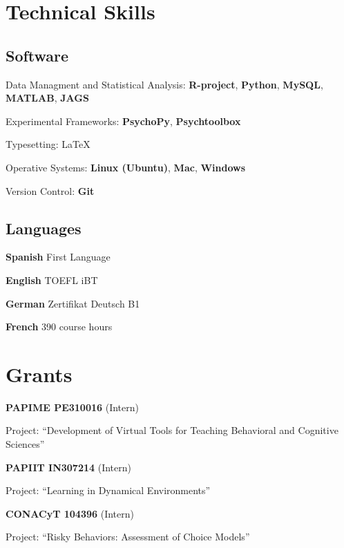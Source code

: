 \documentclass[letterpaper]{article}
\renewenvironment{itemize}{
  \begin{list}{}{
    \setlength{\leftmargin}{1.5em}
  }
}{
  \end{list}
}
\newcommand\textline[4][t]{%
  \par\smallskip\indent\parbox[#1]{.7\textwidth}{\raggedright\texttt{}#2}%
  \parbox[#1]{.05\textwidth}{\raggedright#3}%
  \parbox[#1]{.25\textwidth}{\raggedleft{#4}}\par%
}
\begin{document}
\section*{Technical Skills}

\subsection*{Software}
\begin{itemize}
\setlength\itemsep{-.25em}
\setlength{\itemindent}{-.125in}
	\item Data Managment and Statistical Analysis: {\bf R-project}, {\bf Python}, {\bf MySQL}, {\bf MATLAB}, {\bf JAGS}
	\item Experimental Frameworks: {\bf PsychoPy}, {\bf Psychtoolbox}
	\item Typesetting: \LaTeX
	\item Operative Systems: {\bf Linux (Ubuntu)}, {\bf Mac}, {\bf Windows}
	\item Version Control: {\bf Git}
\end{itemize}

\subsection*{Languages}
\begin{itemize}
\setlength\itemsep{-.25em}
\setlength{\itemindent}{-.125in}
	\item{\bf Spanish} First Language
	\item{\bf English} TOEFL iBT
	\item{\bf German} Zertifikat Deutsch B1
	\item{\bf French} 390 course hours
\end{itemize}






\section*{Grants}
\begin{itemize}
\setlength\itemsep{-.25em}
\setlength{\itemindent}{-.125in}
	\item \textline{{\bf PAPIME PE310016} (Intern)}{\hspace{1pt}}{2015} 
	\item {Project: ``Development of Virtual Tools for Teaching Behavioral and Cognitive Sciences''}
	\item \textline{{\bf PAPIIT IN307214} (Intern)}{\hspace{1pt}}{2014} 
	\item {Project: ``Learning in Dynamical Environments''}
	\item \textline{{\bf CONACyT 104396} (Intern)}{\hspace{1pt}}{2011} 
	\item {Project: ``Risky Behaviors: Assessment of Choice Models''}
\end{itemize}
\end{document}
